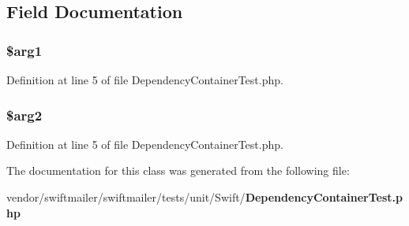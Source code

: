 \subsection{Field Documentation}
\subsubsection[{\$arg1}]{\setlength{\rightskip}{0pt plus 5cm}\$arg1}\label{class_one_a48f6ffca9929c1b0ddce438967e3c65a}


Definition at line 5 of file Dependency\+Container\+Test.\+php.

\subsubsection[{\$arg2}]{\setlength{\rightskip}{0pt plus 5cm}\$arg2}\label{class_one_a11dd337515806936bf2a429a94d84e3c}


Definition at line 5 of file Dependency\+Container\+Test.\+php.



The documentation for this class was generated from the following file\+:\begin{DoxyCompactItemize}
\item 
vendor/swiftmailer/swiftmailer/tests/unit/\+Swift/{\bf Dependency\+Container\+Test.\+php}\end{DoxyCompactItemize}

